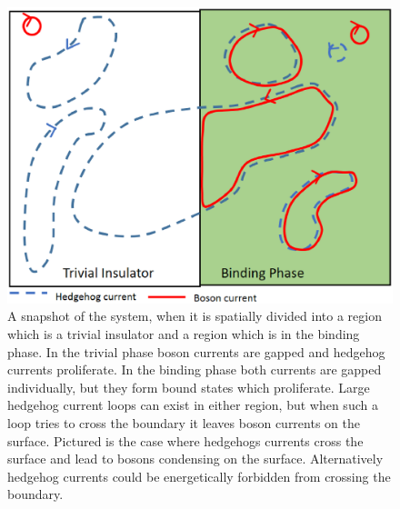 \documentclass[prb,twocolumn]{revtex4-1}
\begin{document}
\begin{figure}
\includegraphics[angle=-90,width=0.9\linewidth]{figures/surface.eps}
\caption{A snapshot of the system, when it is spatially divided into a region which is a trivial insulator and a region which is in the binding phase. In the trivial phase boson currents are gapped and hedgehog currents proliferate. In the binding phase both currents are gapped individually, but they form bound states which proliferate. Large hedgehog current loops can exist in either region, but when such a loop tries to cross the boundary it leaves boson currents on the surface. Pictured is the case where hedgehogs currents cross the surface and lead to bosons condensing on the surface. Alternatively hedgehog currents could be energetically forbidden from crossing the boundary.}
\label{surface}
\end{figure}

\end{document}

